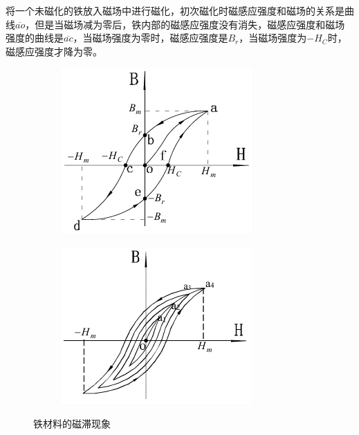 \documentclass{ctexart}
\begin{document}
将一个未磁化的铁放入磁场中进行磁化，初次磁化时磁感应强度和磁场的关系是曲线$\overline{ao}$，但是当磁场减为零后，铁内部的磁感应强度没有消失，磁感应强度和磁场强度的曲线是$\overline{ac}$，当磁场强度为零时，磁感应强度是$B_r$，当磁场强度为$-H_C$时，磁感应强度才降为零。
\begin{figure}[H]
  \centering
  \begin{subfigure}{0.48\linewidth}
    \includegraphics[width=\linewidth]{figures/磁滞现象1}
  \end{subfigure}
  \begin{subfigure}{0.48\linewidth}
    \includegraphics[width=\linewidth]{figures/磁滞现象2}
  \end{subfigure}
  \caption{铁材料的磁滞现象}
\end{figure}
\end{document}

